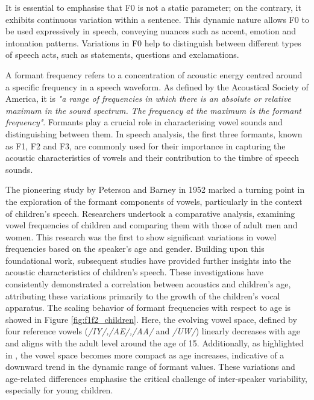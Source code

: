 It is essential to emphasise that F0 is not a static parameter; on the contrary, it exhibits continuous variation within a sentence. This dynamic nature allows F0 to be used expressively in speech, conveying nuances such as accent, emotion and intonation patterns. Variations in F0 help to distinguish between different types of speech acts, such as statements, questions and exclamations.

A formant  frequency refers to a concentration of acoustic energy centred around a specific frequency in a speech waveform. As defined by the Acoustical Society of America, it is \textit{"a range of frequencies in which there is an absolute or relative maximum in the sound spectrum. The frequency at the maximum is the formant frequency"}. Formants play a crucial role in characterising vowel sounds and distinguishing between them. In speech analysis, the first three formants, known as F1, F2 and F3, are commonly used for their importance in capturing the acoustic characteristics of vowels and their contribution to the timbre of speech sounds.


The pioneering study by Peterson and Barney in 1952 \cite{first_vowel_study} marked a turning point in the exploration of the formant components of vowels, particularly in the context of children's speech. Researchers undertook a comparative analysis, examining vowel frequencies of children and comparing them with those of adult men and women. This research was the first to show significant variations in vowel frequencies based on the speaker's age and gender. Building upon this foundational work, subsequent studies \cite{reviewASRchildren,Acoustic_change_children,why_children_speech_no_working} have provided further insights into the acoustic characteristics of children's speech. These investigations have consistently demonstrated a correlation between acoustics and children's age, attributing these variations primarily to the growth of the children's vocal apparatus. The scaling behavior of formant frequencies with respect to age is showed in Figure \ref{fig:f1f2_children}. Here, the evolving vowel space, defined by four reference vowels (\textit{/IY/,/AE/,/AA/} and \textit{/UW/}) linearly decreases with age and aligns with the adult level around the age of 15. Additionally, as highlighted in \cite{reviewASRchildren}, the vowel space becomes more compact as age increases, indicative of a downward trend in the dynamic range of formant values. These variations and age-related differences emphasise the critical challenge of inter-speaker variability, especially for young children.


